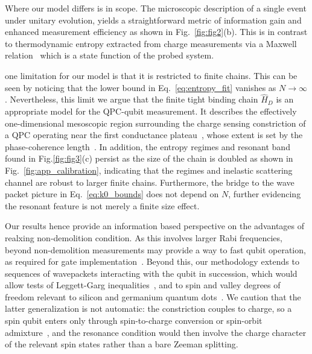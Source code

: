 \documentclass[10pt,
 amsmath,amssymb,
 aps,prb, twocolumn
]{revtex4-2}
\newcommand\sj[1]{ {\color{cyan} #1} }
\begin{document}
Where our model differs is in scope. The microscopic description of a single event under unitary evolution, yields a straightforward metric of information gain and enhanced measurement efficiency as shown in Fig.~\ref{fig:fig2}(b). This is in contrast to thermodynamic entropy extracted from charge measurements via a Maxwell relation~\cite{hartmanDirectEntropy2018, childEntropyMeasurement2022} which is a state function of the probed system. 

\sj{one limitation for our model is that it is restricted to finite chains. This can be seen by noticing that the lower bound in Eq.~\eqref{eq:entropy_fit} vanishes as \mbox{$N\rightarrow\infty$}}. Nevertheless, this limit we argue that the finite tight binding chain \mbox{$\hat{H}_D$} is an appropriate model for the QPC-qubit measurement. It describes the effectively one-dimensional mesoscopic region surrounding the charge sensing constriction of a QPC operating near the first conductance plateau~\cite{vanwees1988, wharam1988, vanhouten1996}, whose extent is set by the phase-coherence length~\cite{bruusManyBodyQuantum2004, tekman1991}. In addition, the entropy regimes and resonant band found in Fig.\ref{fig:fig3}(c) persist as the size of the chain is doubled as shown in Fig.~\ref{fig:app_calibration}, indicating that the regimes and inelastic scattering channel are robust to larger finite chains. \sj{Furthermore, the bridge to the wave packet picture in Eq.~\eqref{eq:k0_bounds} does not depend on $N$, further evidencing the resonant feature is not merely a finite size effect.}

Our results hence provide an information based perspective on the advantages of realxing non-demolition condition. As this involves larger Rabi frequencies, beyond non-demolition measurements may provide a way to fast qubit operation, as required for gate implementation~\cite{wangExperimentalNonadiabatic2016}. Beyond this, our methodology extends to sequences of wavepackets interacting with the qubit in succession, which would allow tests of Leggett-Garg inequalities~\cite{jordan2008}, and to spin and valley degrees of freedom relevant to silicon and germanium quantum dots~\cite{lossQuantumComputation1998, scappucciGermaniumQuantum2021}.
We caution that the latter generalization is not automatic: the constriction couples to charge, so a spin qubit enters only through spin-to-charge conversion or spin-orbit admixture~\cite{borhaniGolovachLoss2006}, and the resonance condition would then involve the charge character of the relevant spin states rather than a bare Zeeman splitting.
\end{document}
